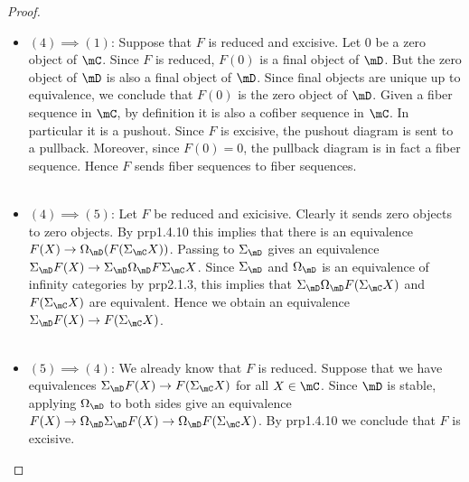 \documentclass[a4paper]{article}
\begin{document}
\begin{prp}{}{}
\begin{proof}
\begin{itemize}
\item $(4)\implies (1)$: Suppose that $F$ is reduced and excisive. Let $0$ be a zero object of $\mC$. Since $F$ is reduced, $F(0)$ is a final object of $\mD$. But the zero object of $\mD$ is also a final object of $\mD$. Since final objects are unique up to equivalence, we conclude that $F(0)$ is the zero object of $\mD$. Given a fiber sequence in $\mC$, by definition it is also a cofiber sequence in $\mC$. In particular it is a pushout. Since $F$ is excisive, the pushout diagram is sent to a pullback. Moreover, since $F(0)=0$, the pullback diagram is in fact a fiber sequence. Hence $F$ sends fiber sequences to fiber sequences. \\~\\

\item $(4)\implies(5)$: Let $F$ be reduced and exicisive. Clearly it sends zero objects to zero objects. By prp1.4.10 this implies that there is an equivalence $F(X)\to\Omega_\mD(F(\Sigma_\mC X))$. Passing to $\Sigma_\mD$ gives an equivalence $\Sigma_\mD F(X)\to\Sigma_\mD\Omega_\mD F\Sigma_\mC X$. Since $\Sigma_\mD$ and $\Omega_\mD$ is an equivalence of infinity categories by prp2.1.3, this implies that $\Sigma_\mD\Omega_\mD F(\Sigma_\mC X)$ and $F(\Sigma_\mC X)$ are equivalent. Hence we obtain an equivalence $\Sigma_\mD F(X)\to F(\Sigma_\mC X)$. \\~\\

\item $(5)\implies(4)$: We already know that $F$ is reduced. Suppose that we have equivalences $\Sigma_\mD F(X)\to F(\Sigma_\mC X)$ for all $X\in\mC$. Since $\mD$ is stable, applying $\Omega_\mD$ to both sides give an equivalence $F(X)\to \Omega_\mD\Sigma_\mD F(X)\to\Omega_\mD F(\Sigma_\mC X)$. By prp1.4.10 we conclude that $F$ is excisive. 
\end{itemize}
\end{proof}
\end{prp}
\end{document}
